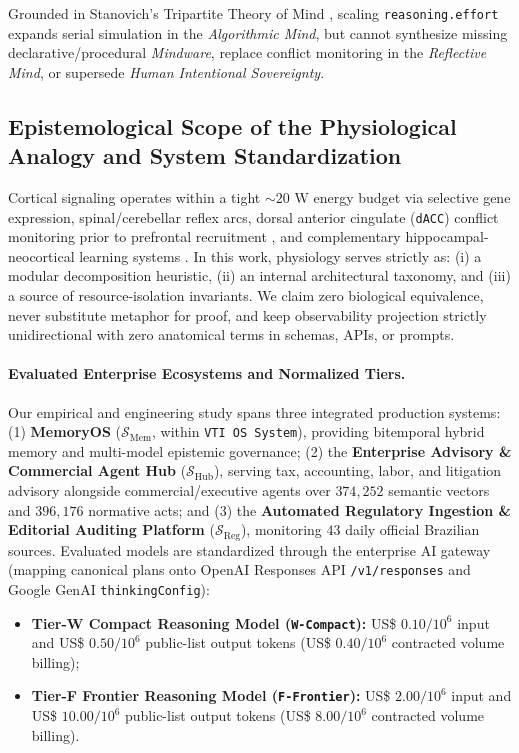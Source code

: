 \documentclass[10pt,twocolumn]{article}
\begin{document}
Grounded in Stanovich's Tripartite Theory of Mind \cite{stanovich2009what,stanovich2011rationality,stanovich2016rationality,evans2013dual,deneys2023advancing}, scaling \texttt{reasoning.effort} expands serial simulation in the \emph{Algorithmic Mind}, but cannot synthesize missing declarative/procedural \emph{Mindware}, replace conflict monitoring in the \emph{Reflective Mind}, or supersede \emph{Human Intentional Sovereignty}.

\subsection{Epistemological Scope of the Physiological Analogy and System Standardization}

Cortical signaling operates within a tight $\sim 20\text{ W}$ energy budget via selective gene expression, spinal/cerebellar reflex arcs, dorsal anterior cingulate (\texttt{dACC}) conflict monitoring prior to prefrontal recruitment \cite{attwell2001energy,botvinick2001conflict,baddeley2000episodic}, and complementary hippocampal-neocortical learning systems \cite{mcclelland1995why,gutierrez2024hipporag}. In this work, physiology serves strictly as: (i) a modular decomposition heuristic, (ii) an internal architectural taxonomy, and (iii) a source of resource-isolation invariants. We claim zero biological equivalence, never substitute metaphor for proof, and keep observability projection strictly unidirectional with zero anatomical terms in schemas, APIs, or prompts.

\paragraph{Evaluated Enterprise Ecosystems and Normalized Tiers.}
Our empirical and engineering study spans three integrated production systems: (1) \textbf{MemoryOS} ($\mathcal{S}_{\mathrm{Mem}}$, within \texttt{VTI OS System}), providing bitemporal hybrid memory and multi-model epistemic governance; (2) the \textbf{Enterprise Advisory \& Commercial Agent Hub} ($\mathcal{S}_{\mathrm{Hub}}$), serving tax, accounting, labor, and litigation advisory alongside commercial/executive agents over $374{,}252$ semantic vectors and $396{,}176$ normative acts; and (3) the \textbf{Automated Regulatory Ingestion \& Editorial Auditing Platform} ($\mathcal{S}_{\mathrm{Reg}}$), monitoring $43$ daily official Brazilian sources. Evaluated models are standardized through the enterprise AI gateway (mapping canonical plans onto OpenAI Responses API \texttt{/v1/responses} and Google GenAI \texttt{thinkingConfig}):
\begin{itemize}[leftmargin=*,nosep]
  \item \textbf{Tier-W Compact Reasoning Model (\texttt{W-Compact}):} US\$ $0.10 / 10^6$ input and US\$ $0.50 / 10^6$ public-list output tokens (US\$ $0.40 / 10^6$ contracted volume billing);
  \item \textbf{Tier-F Frontier Reasoning Model (\texttt{F-Frontier}):} US\$ $2.00 / 10^6$ input and US\$ $10.00 / 10^6$ public-list output tokens (US\$ $8.00 / 10^6$ contracted volume billing).
\end{itemize}
\end{document}
